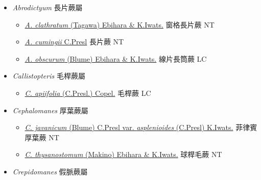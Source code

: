 
  \begin{itemize}
 \item[    ] \textit{Abrodictyum} 長片蕨屬
                                
  \begin{itemize}
        \item[] \href{http://www.theplantlist.org/tpl1.1/search?q=Abrodictyum+clathratum}{\textit{A. clathratum} (Tagawa) Ebihara \& K.Iwats.}   窗格長片蕨   NT
        \item[] \href{http://www.theplantlist.org/tpl1.1/search?q=Abrodictyum+cumingii}{\textit{A. cumingii} C.Presl}   長片蕨   NT
        \item[] \href{http://www.theplantlist.org/tpl1.1/search?q=Abrodictyum+obscurum}{\textit{A. obscurum} (Blume) Ebihara \& K.Iwats.}   線片長筒蕨   LC
  \end{itemize}
 \item[    ] \textit{Callistopteris} 毛桿蕨屬
                                
  \begin{itemize}
        \item[] \href{http://www.theplantlist.org/tpl1.1/search?q=Callistopteris+apiifolia}{\textit{C. apiifolia} (C.Presl.) Copel.}   毛桿蕨   LC
  \end{itemize}
 \item[    ] \textit{Cephalomanes} 厚葉蕨屬
                                
  \begin{itemize}
        \item[] \href{http://www.theplantlist.org/tpl1.1/search?q=Cephalomanes+javanicum+var.+asplenioides}{\textit{C. javanicum} (Blume) C.Presl var. \textit{asplenioides} (C.Presl) K.Iwats.}  
                                        菲律賓厚葉蕨   NT
        \item[] \href{http://www.theplantlist.org/tpl1.1/search?q=Cephalomanes+thysanostomum}{\textit{C. thysanostomum} (Makino) Ebihara \& K.Iwats.}   球桿毛蕨   NT
  \end{itemize}
 \item[    ] \textit{Crepidomanes} 假脈蕨屬
                                

\end{itemize}
